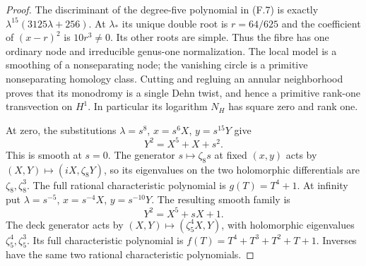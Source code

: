 \begin{proof}
The discriminant of the degree-five polynomial in (F.7) is exactly
$\lambda^{15}(3125\lambda+256)$.  At $\lambda_*$ its unique double
root is $r=64/625$ and the coefficient of $(x-r)^2$ is
$10r^3\ne0$.  Its other roots are simple.  Thus the fibre has one
ordinary node and irreducible genus-one normalization.  The local
model is a smoothing of a nonseparating node; the vanishing circle
is a primitive nonseparating homology class.  Cutting and regluing
an annular neighborhood proves that its monodromy is a single
Dehn twist, and hence a primitive rank-one transvection on $H^1$.
In particular its logarithm $N_H$ has square zero and rank one.

At zero, the substitutions $\lambda=s^8$, $x=s^6X$, $y=s^{15}Y$
give
\[
 Y^2=X^5+X+s^2.
\]
This is smooth at $s=0$.  The generator $s\mapsto\zeta_8s$ at
fixed $(x,y)$ acts by $(X,Y)\mapsto(iX,\zeta_8Y)$, so its
eigenvalues on the two holomorphic differentials are
$\zeta_8,\zeta_8^3$.  The full rational characteristic polynomial
is $g(T)=T^4+1$.
At infinity put $\lambda=s^{-5}$, $x=s^{-4}X$, $y=s^{-10}Y$.
The resulting smooth family is
\[
 Y^2=X^5+sX+1.
\]
The deck generator acts by $(X,Y)\mapsto(\zeta_5^4X,Y)$,
with holomorphic eigenvalues $\zeta_5^4,\zeta_5^3$.  Its full
characteristic polynomial is $f(T)=T^4+T^3+T^2+T+1$.
Inverses have the same two rational characteristic polynomials.


\end{proof}
